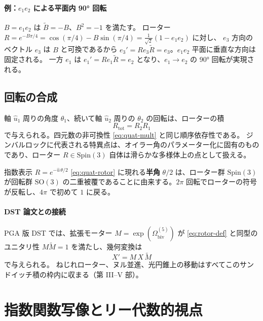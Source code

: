 \documentclass[dvipdfmx,a4paper,oneside]{jsbook}
\numberwithin{equation}{chapter}
\begin{document}
\paragraph{例：\(e_1 e_2\) による平面内 90° 回転}
\(B = e_1 e_2\) は \(\widetilde{B} = -B\)、\(B^2 = -1\) を満たす。
ローター \(R = e^{-B\pi/4} = \cos(\pi/4) - B\sin(\pi/4) = \tfrac{1}{\sqrt{2}}(1 - e_1 e_2)\) に対し、
\(e_3\) 方向のベクトル \(e_3\) は \(B\) と可換であるから \(e_3' = R e_3 \widetilde{R} = e_3\)。\(e_1 e_2\) 平面に垂直な方向は固定される。
一方 \(e_1\) は \(e_1' = R e_1 \widetilde{R} = e_2\) となり、\(e_1 \to e_2\) の 90° 回転が実現される。

\subsection{回転の合成}

軸 \(\hat{u}_1\) 周りの角度 \(\theta_1\)、続いて軸 \(\hat{u}_2\) 周りの \(\theta_2\) の回転は、ローターの積
\begin{equation}
  R_{\mathrm{tot}} = R_2 R_1
  \label{eq:rotor-composition}
\end{equation}
で与えられる。四元数の非可換性 \eqref{eq:quat-mult} と同じ順序依存性である。
ジンバルロックに代表される特異点は、オイラー角のパラメーター化に固有のものであり、ローター \(R \in \mathrm{Spin}(3)\) 自体は滑らかな多様体上の点として扱える。

指数表示 \(R = e^{-\hat{u}\,\theta/2}\) \eqref{eq:quat-rotor} に現れる\textbf{半角} \(\theta/2\) は、ローター群 \(\mathrm{Spin}(3)\) が回転群 \(\mathrm{SO}(3)\) の二重被覆であることに由来する。\(2\pi\) 回転でローターの符号が反転し、\(4\pi\) で初めて \(1\) に戻る。

\paragraph{DST 論文との接続}
PGA 版 DST では、拡張モーター \(M = \exp(\Omega_{\mathrm{biv}}^{(5)})\) が \eqref{eq:rotor-def} と同型のユニタリ性 \(M\widetilde{M}=1\) を満たし、幾何変換は
\begin{equation}
  X' = M\,X\,\widetilde{M}
  \label{eq:motor-sandwich}
\end{equation}
で与えられる。
ねじれローター、ヌル並進、光円錐上の移動はすべてこのサンドイッチ積の枠内に収まる（第 III--V 部）。

\section{指数関数写像とリー代数的視点}
\end{document}
